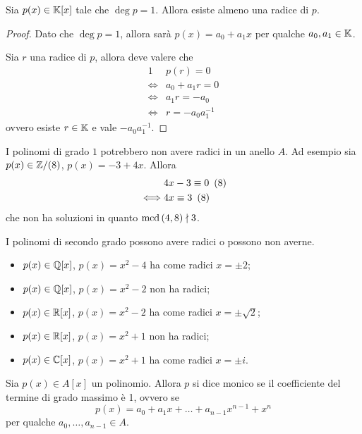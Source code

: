 \begin{proposition}
    Sia $p(x) \in \mathbb{K}[x]$ tale che $\deg p = 1$. Allora esiste almeno una radice di $p$.
\end{proposition}
\begin{proof}
    Dato che $\deg p = 1$, allora sarà $p(x) = a_0 + a_1x$ per qualche $a_0, a_1 \in \mathbb{K}$.

    Sia $r$ una radice di $p$, allora deve valere che \begin{alignat*}
        {1}
        &p(r) = 0 \\
        \iff &a_0 + a_1r = 0 \\
        \iff &a_1r = -a_0 \\
        \iff &r = -a_0a_1^{-1}
    \end{alignat*}
    ovvero esiste $r \in \mathbb{K}$ e vale $-a_0a_1^{-1}$.
\end{proof}

\begin{remark}
    I polinomi di grado $1$ potrebbero non avere radici in un anello $A$. Ad esempio sia $p(x) \in \mathbb{Z}/(8)$, $p(x) = -3 + 4x$. Allora \begin{alignat*}
        {1}
        &4x - 3\equiv 0 \ \left(8\right) \\
        \iff &4x \equiv 3 \ \left(8\right)
    \end{alignat*}
    che non ha soluzioni in quanto $\operatorname{mcd}\left(4, 8\right) \nmid 3$.
\end{remark}

\begin{remark}
    I polinomi di secondo grado possono avere radici o possono non averne.
    \begin{itemize}
        \item $p(x) \in \mathbb{Q}[x]$, $p(x) = x^2 - 4$ ha come radici $x = \pm 2$;
        \item $p(x) \in \mathbb{Q}[x]$, $p(x) = x^2 - 2$ non ha radici;
        \item $p(x) \in \mathbb{R}[x]$, $p(x) = x^2 - 2$ ha come radici $x = \pm \sqrt{2}$;
        \item $p(x) \in \mathbb{R}[x]$, $p(x) = x^2 + 1$ non ha radici;        \item $p(x) \in \mathbb{C}[x]$, $p(x) = x^2 + 1$ ha come radici $x = \pm i$.
    \end{itemize}
\end{remark}

\begin{definition}
    Sia $p(x) \in A[x]$ un polinomio. Allora $p$ si dice monico se il coefficiente del termine di grado massimo è 1, ovvero se \[
        p(x) = a_0 + a_1x + \dots + a_{n-1}x^{n-1} + x^n    
    \] per qualche $a_0, \dots, a_{n-1} \in A$.
\end{definition}

